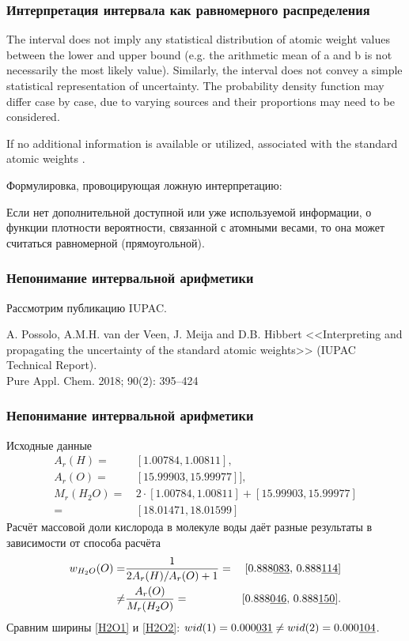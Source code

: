 \begin{frame}
	\frametitle{Интерпретация интервала как равномерного распределения}
{\footnotesize 
	The interval does not imply any statistical distribution of atomic weight values between the lower and upper bound (e.g. the arithmetic mean of a and b is not necessarily the most likely value). Similarly, the interval does not convey a simple statistical representation of uncertainty. The probability density function may differ case by case, due to varying sources and their proportions may need to be considered. 
	
	If no additional information is available or utilized,  associated with the standard atomic weights .
}
Формулировка, провоцирующая ложную интерпретацию:

Если нет дополнительной доступной или уже используемой информации, о функции плотности вероятности, связанной с атомными весами, то она может считаться равномерной (прямоугольной).
	
\end{frame}


\begin{frame}
	\frametitle{Непонимание интервальной арифметики}

Рассмотрим публикацию IUPAC.

\medskip	
A. Possolo, A.M.H. van der Veen, J. Meija and D.B. Hibbert
<<Interpreting and propagating the uncertainty of the standard atomic weights>> (IUPAC Technical Report). \\
Pure Appl. Chem. 2018; 90(2): 395–424 %




\end{frame}

\begin{frame}
	\frametitle{Непонимание интервальной арифметики}
Исходные данные
	\begin{align*}
A_r(H) = & \, [1.007 84, 1.008 11],\\
A_r(O) = & \,[15.999 03, 15.999 77]], \\
M_r(H_2O) = & \, 2 \cdot[1.007 84, 1.00811] + [15.99903,15.999 77] \\
 = & \,[18.01471, 18.015 99]
\end{align*}
Расчёт массовой доли кислорода в молекуле воды даёт разные результаты в зависимости от способа расчёта
\begin{align}
		w_{H_2O}(O) = & \frac{1}{2A_r(H)/A_r(O)+1} = &[0.888 \underline{083}, \, 0.888 \underline{114}] \label{H2O1} \\
		\ne & \frac{A_r(O)}{M_r(H_2O)} =& [0.888 \underline{046}, \, 0.888\underline{150}]. \label{H2O2}
\end{align}
Сравним ширины \eqref{H2O1}	и \eqref{H2O2}:
$wid (1) = 0.000\underline{031} \ne wid (2) = 0.000\underline{104} $.
	
\end{frame}



